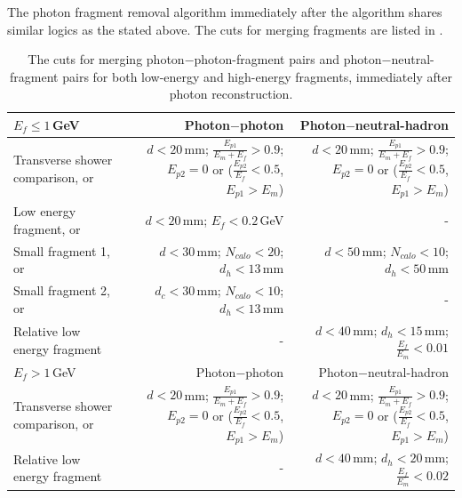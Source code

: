 The photon fragment removal algorithm immediately after the \PhotonReconstruction algorithm shares similar logics as the stated above. The cuts for merging fragments are listed in .



\begin{table}[htbp]
\centering

\smallskip

\begin{tabular}{l  r  r }
\hline
\hline
$E_f\leqslant1$\,GeV &  Photon$-$photon & Photon$-$neutral-hadron \\
\hline
\multicolumn{1}{L{0.3\textwidth}}{Transverse shower comparison, or} & \multicolumn{1}{R{0.3\textwidth}}{$d < 20 $\,mm; $\frac{E_{p1}}{E_m + E_f} > 0.9 $; $E_{p2} = 0$ or ($\frac{E_{p2}}{E_f} < 0.5 $, $E_{p1} > E_m$)}  & \multicolumn{1}{R{0.3\textwidth}}{$d < 20 $\,mm; $\frac{E_{p1}}{E_m + E_f} > 0.9 $; $E_{p2} = 0$ or ($\frac{E_{p2}}{E_f} < 0.5 $, $E_{p1} > E_m$)} \\
\multicolumn{1}{L{0.3\textwidth}}{Low energy fragment, or} & \multicolumn{1}{R{0.3\textwidth}}{$d < 20 $\,mm; $E_f < 0.2 $\,GeV}  & \multicolumn{1}{R{0.3\textwidth}}{-} \\
\multicolumn{1}{L{0.3\textwidth}}{Small fragment 1, or} & \multicolumn{1}{R{0.3\textwidth}}{$d < 30 $\,mm; $N_{calo} < 20 $; $d_h < 13 $\,mm}  & \multicolumn{1}{R{0.3\textwidth}}{$d < 50 $\,mm; $N_{calo} < 10 $; $d_h < 50$\,mm} \\
\multicolumn{1}{L{0.3\textwidth}}{Small fragment 2, or} & \multicolumn{1}{R{0.3\textwidth}}{$d_c < 30 $\,mm; $N_{calo} < 10 $; $d_h < 13 $\,mm}  & \multicolumn{1}{R{0.3\textwidth}}{-} \\

\multicolumn{1}{L{0.3\textwidth}}{Relative low energy fragment} & \multicolumn{1}{R{0.3\textwidth}}{-}  & \multicolumn{1}{R{0.3\textwidth}}{$d < 40$\,mm; $d_h < 15$\,mm; $\frac{E_{f}}{E_m} < 0.01$} \\
\hline
$E_f>1$\,GeV &  Photon$-$photon & Photon$-$neutral-hadron \\
\hline
\multicolumn{1}{L{0.3\textwidth}}{Transverse shower comparison, or} & \multicolumn{1}{R{0.3\textwidth}}{$d< 20$\,mm; $\frac{E_{p1}}{E_m + E_f} > 0.9 $; $E_{p2} = 0$ or ($\frac{E_{p2}}{E_f} < 0.5 $, $E_{p1} > E_m$)}  & \multicolumn{1}{R{0.3\textwidth}}{$d< 20$\,mm; $\frac{E_{p1}}{E_m + E_f} > 0.9 $; $E_{p2} = 0$ or ($\frac{E_{p2}}{E_f} < 0.5 $, $E_{p1} > E_m$)} \\
\multicolumn{1}{L{0.3\textwidth}}{Relative low energy fragment } & \multicolumn{1}{R{0.3\textwidth}}{-} & \multicolumn{1}{R{0.3\textwidth}}{$d < 40$\,mm; $d_h < 20$\,mm; $\frac{E_f}{E_m} < 0.02$} \\
\hline
\hline
\end{tabular}

\caption[The cuts for photon fragment removal algorithm in the \ECAL.]%
{The cuts for merging photon$-$photon-fragment pairs and photon$-$neutral-fragment pairs for both low-energy and high-energy fragments, immediately after photon reconstruction. }
\label{tab:photonFragRemovalCuts2}
\end{table} 

